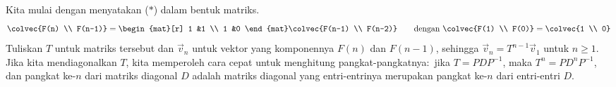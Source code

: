 Kita mulai dengan menyatakan ($*$) dalam bentuk matriks.
\begin{equation*}
  \colvec{F(n) \\ F(n-1)}
  =
  \begin{mat}[r]
    1  &1   \\
    1  &0
  \end{mat}
  \colvec{F(n-1) \\ F(n-2)}
  \qquad\text{dengan $\colvec{F(1) \\ F(0)}=\colvec{1 \\  0}$}
\end{equation*}  
Tuliskan $T$ untuk matriks tersebut dan $\vec{v}_{n}$ untuk vektor yang
komponennya $F(n)$ dan $F(n-1)$, sehingga
$\vec{v}_{n}=T^{n-1}\vec{v}_1$ untuk $n\geq 1$.
Jika kita mendiagonalkan $T$, kita memperoleh cara cepat untuk menghitung
pangkat-pangkatnya:~jika $T=PDP^{-1}$, maka $T^n=PD^nP^{-1}$, dan pangkat
ke-$n$ dari matriks diagonal $D$ adalah matriks diagonal yang entri-entrinya
merupakan pangkat ke-$n$ dari entri-entri $D$.

